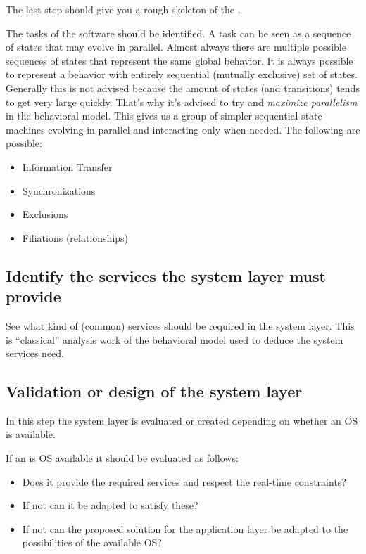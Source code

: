 The last step should give you a rough skeleton of the .

The tasks of the software should be identified.
A task can be seen as a sequence of states that may evolve in parallel.
Almost always there are multiple possible sequences of states that represent the same global behavior.
It is always possible to represent a behavior with entirely sequential (mutually exclusive) set of states.
Generally this is not advised because the amount of states (and transitions) tends to get very large quickly.
That's why it's advised to try and \emph{maximize parallelism} in the behavioral model.
This gives us a group of simpler sequential state machines evolving in parallel and interacting only when needed.
The following  are possible:
\begin{itemize}
	\item Information Transfer
	\item Synchronizations 
	\item Exclusions 
	\item Filiations (relationships)
\end{itemize}



\subsection{Identify the services the system layer must provide}
\label{sss:services}
See what kind of (common) services should be required in the  system layer. 
This is ``classical'' analysis work of the behavioral model used to deduce the system services need.




\subsection{Validation or design of the system layer}
\label{sss:valid}
In  this step the  system layer is evaluated or created depending on whether an OS is available.

If an is OS available it should be evaluated as follows:
\begin{itemize}
	\item Does it provide the required services and respect the real-time constraints? 
	\item If not can it be adapted to satisfy these?
	\item If not can the proposed solution for the application layer be adapted to the possibilities of the available OS?
\end{itemize}

